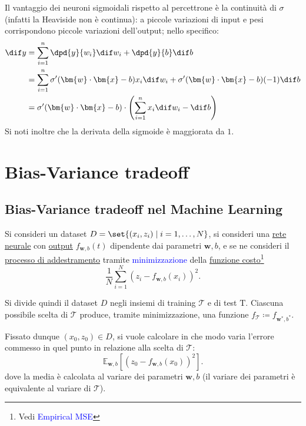 \documentclass[10pt]{book}
\newcommand{\1}{\mathds{1}}
\newcommand{\media}{\mathds{E}}
\theoremstyle{definition}%
\theoremstyle{plain}
\theoremstyle{remark}
\renewcommand{\href}[2]{\textcolor{blue}{#2}}
\begin{document}
Il vantaggio dei neuroni sigmoidali rispetto al percettrone è la continuità di \(\sigma\) (infatti la Heaviside non è continua): a piccole variazioni di input e pesi corrispondono piccole variazioni dell'output; nello specifico:
\begin{align*}
\dif y &= \sum_{i=1}^{n} \dpd{y}{w_{i}}\dif w_{i} + \dpd{y}{b}\dif b \\
&= \sum_{i=1}^{n} \sigma'(\bm{w}\cdot \bm{x}-b) x_{i}\dif w_{i} + \sigma'(\bm{w}\cdot \bm{x}-b) (-1)\dif b\\
&= \sigma'(\bm{w}\cdot \bm{x}-b) \cdot\left(
\sum_{i=1}^{n} x_{i}\dif w_{i} - \dif b
\right)
\end{align*}
Si noti inoltre che la derivata della sigmoide è maggiorata da \(1\).
\chapter{Bias-Variance tradeoff}
\label{sec:org2b71000}
\section{Bias-Variance tradeoff nel Machine Learning}
\label{sec:orgd8d470f}

Si consideri un dataset \(D=\set{(x_{i},z_{i})\mid i =1,\dots,N}\), si consideri una \hyperref[sec:orgbb3f8c2]{rete neurale} con \hyperref[sec:orgbb3f8c2]{output} \(f_{\bm{w},b}(t)\) dipendente dai parametri \(\bm{w},b\), e se ne consideri il \hyperref[sec:org8a5b276]{processo di addestramento} tramite \href{../../../../../org/roam/20250627153729-condizioni_necessarie_per_l_esistenza_di_un_minimo_di_una_funzione_reale.org}{minimizzazione} della \hyperref[sec:org1b3d1fb]{funzione costo}\footnote{Vedi \href{../../../../../org/roam/20250710141709-mean_square_error.org}{Empirical MSE}}
\begin{equation*}
\frac{1}{N}\sum_{i=1}^{N} (z_{i}- f_{\bm{w},b}(x_{i}))^{2}.
\end{equation*}

Si divide quindi il dataset \(D\) negli insiemi di training \(\mathscr{T}\) e di test \(\mathrm{T}\). Ciascuna possibile scelta di \(\mathscr{T}\) produce, tramite minimizzazione, una funzione \(f_{\mathscr{T}}\coloneqq f_{\bm{w}^{*},b^{*}}\).

Fissato dunque \((x_{0},z_{0}) \in D\), si vuole calcolare in che modo varia l'errore commesso in quel punto in relazione alla scelta di \(\mathscr{T}\):
\begin{equation*}
\media_{\bm{w},b}\left[\left(z_{0}-f_{\bm{w},b}(x_{0})\right)^{2}\right].
\end{equation*}
dove la media è calcolata al variare dei parametri \(\bm{w},b\) (il variare dei parametri è equivalente al variare di \(\mathscr{T}\)).
\end{document}
